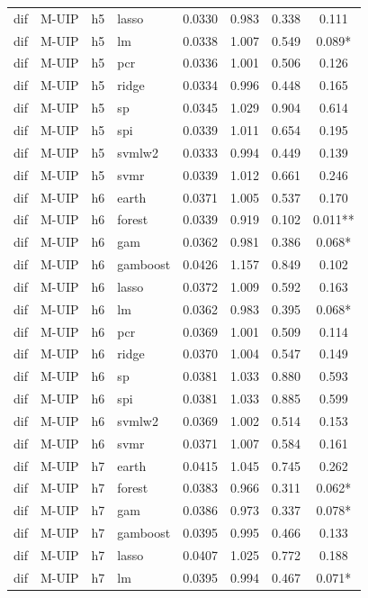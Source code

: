 \begin{ThreePartTable}
\begin{longtable}[t]{llclcccc}
dif & M-UIP & h5 & lasso & 0.0330 & 0.983 & 0.338 & 0.111\\
dif & M-UIP & h5 & lm & 0.0338 & 1.007 & 0.549 & 0.089*\\
dif & M-UIP & h5 & pcr & 0.0336 & 1.001 & 0.506 & 0.126\\
dif & M-UIP & h5 & ridge & 0.0334 & 0.996 & 0.448 & 0.165\\
dif & M-UIP & h5 & sp & 0.0345 & 1.029 & 0.904 & 0.614\\
dif & M-UIP & h5 & spi & 0.0339 & 1.011 & 0.654 & 0.195\\
dif & M-UIP & h5 & svmlw2 & 0.0333 & 0.994 & 0.449 & 0.139\\
dif & M-UIP & h5 & svmr & 0.0339 & 1.012 & 0.661 & 0.246\\
\addlinespace
dif & M-UIP & h6 & earth & 0.0371 & 1.005 & 0.537 & 0.170\\
dif & M-UIP & h6 & forest & 0.0339 & 0.919 & 0.102 & 0.011**\\
dif & M-UIP & h6 & gam & 0.0362 & 0.981 & 0.386 & 0.068*\\
dif & M-UIP & h6 & gamboost & 0.0426 & 1.157 & 0.849 & 0.102\\
dif & M-UIP & h6 & lasso & 0.0372 & 1.009 & 0.592 & 0.163\\
dif & M-UIP & h6 & lm & 0.0362 & 0.983 & 0.395 & 0.068*\\
dif & M-UIP & h6 & pcr & 0.0369 & 1.001 & 0.509 & 0.114\\
dif & M-UIP & h6 & ridge & 0.0370 & 1.004 & 0.547 & 0.149\\
dif & M-UIP & h6 & sp & 0.0381 & 1.033 & 0.880 & 0.593\\
dif & M-UIP & h6 & spi & 0.0381 & 1.033 & 0.885 & 0.599\\
dif & M-UIP & h6 & svmlw2 & 0.0369 & 1.002 & 0.514 & 0.153\\
dif & M-UIP & h6 & svmr & 0.0371 & 1.007 & 0.584 & 0.161\\
\addlinespace
dif & M-UIP & h7 & earth & 0.0415 & 1.045 & 0.745 & 0.262\\
dif & M-UIP & h7 & forest & 0.0383 & 0.966 & 0.311 & 0.062*\\
dif & M-UIP & h7 & gam & 0.0386 & 0.973 & 0.337 & 0.078*\\
dif & M-UIP & h7 & gamboost & 0.0395 & 0.995 & 0.466 & 0.133\\
dif & M-UIP & h7 & lasso & 0.0407 & 1.025 & 0.772 & 0.188\\
dif & M-UIP & h7 & lm & 0.0395 & 0.994 & 0.467 & 0.071*\\

\end{longtable}
\end{ThreePartTable}

